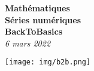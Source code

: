 \begin{center}

    \vspace{15px}
    \Huge{\textbf{Mathématiques}}\\
	\huge{\textbf{Séries numériques}}\\
	\vspace{10px}
	\Large{\textbf{BackToBasics}}\\
	\textit{6 mars 2022}

    \vspace{25px}
	\texttt{[image: img/b2b.png]}
	
\end{center}
